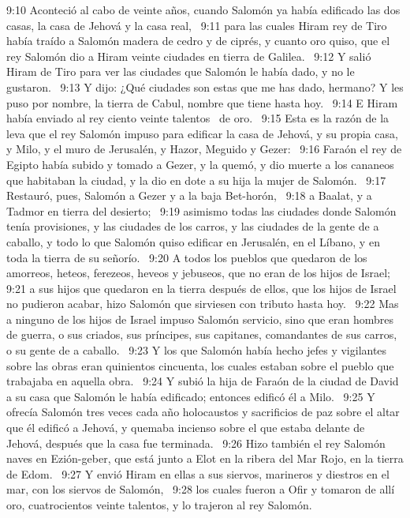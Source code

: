 9:10 Aconteció al cabo de veinte años, cuando Salomón ya había edificado las dos casas, la casa de Jehová y la casa real,  
9:11 para las cuales Hiram rey de Tiro había traído a Salomón madera de cedro y de ciprés, y cuanto oro quiso, que el rey Salomón dio a Hiram veinte ciudades en tierra de Galilea.  
9:12 Y salió Hiram de Tiro para ver las ciudades que Salomón le había dado, y no le gustaron.  
9:13 Y dijo: ¿Qué ciudades son estas que me has dado, hermano? Y les puso por nombre, la tierra de Cabul, nombre que tiene hasta hoy.  
9:14 E Hiram había enviado al rey ciento veinte talentos  de oro.  
9:15 Esta es la razón de la leva que el rey Salomón impuso para edificar la casa de Jehová, y su propia casa, y Milo, y el muro de Jerusalén, y Hazor, Meguido y Gezer:  
9:16 Faraón el rey de Egipto había subido y tomado a Gezer, y la quemó, y dio muerte a los cananeos que habitaban la ciudad, y la dio en dote a su hija la mujer de Salomón.  
9:17 Restauró, pues, Salomón a Gezer y a la baja Bet-horón,  
9:18 a Baalat, y a Tadmor en tierra del desierto;  
9:19 asimismo todas las ciudades donde Salomón tenía provisiones, y las ciudades de los carros, y las ciudades de la gente de a caballo, y todo lo que Salomón quiso edificar en Jerusalén, en el Líbano, y en toda la tierra de su señorío.  
9:20 A todos los pueblos que quedaron de los amorreos, heteos, ferezeos, heveos y jebuseos, que no eran de los hijos de Israel;  
9:21 a sus hijos que quedaron en la tierra después de ellos, que los hijos de Israel no pudieron acabar, hizo Salomón que sirviesen con tributo hasta hoy.  
9:22 Mas a ninguno de los hijos de Israel impuso Salomón servicio, sino que eran hombres de guerra, o sus criados, sus príncipes, sus capitanes, comandantes de sus carros, o su gente de a caballo.  
9:23 Y los que Salomón había hecho jefes y vigilantes sobre las obras eran quinientos cincuenta, los cuales estaban sobre el pueblo que trabajaba en aquella obra.  
9:24 Y subió la hija de Faraón de la ciudad de David a su casa que Salomón le había edificado; entonces edificó él a Milo.  
9:25 Y ofrecía Salomón tres veces cada año holocaustos y sacrificios de paz sobre el altar que él edificó a Jehová, y quemaba incienso sobre el que estaba delante de Jehová, después que la casa fue terminada.  
9:26 Hizo también el rey Salomón naves en Ezión-geber, que está junto a Elot en la ribera del Mar Rojo, en la tierra de Edom.  
9:27 Y envió Hiram en ellas a sus siervos, marineros y diestros en el mar, con los siervos de Salomón,  
9:28 los cuales fueron a Ofir y tomaron de allí oro, cuatrocientos veinte talentos, y lo trajeron al rey Salomón.  
